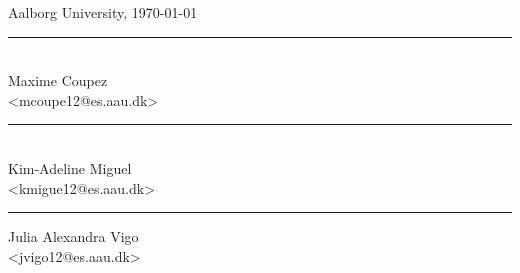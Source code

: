 \vspace{\baselineskip}\hfill Aalborg University, \today
\vfill\noindent
\begin{minipage}[b]{0.45\textwidth}
 \centering
 \rule{\textwidth}{0.5pt}\\
  Maxime Coupez\\
 {\footnotesize <mcoupe12@es.aau.dk>}
\end{minipage}
\hfill
\begin{minipage}[b]{0.45\textwidth}
 \centering
 \rule{\textwidth}{0.5pt}\\
  Kim-Adeline Miguel\\
 {\footnotesize <kmigue12@es.aau.dk>}
\end{minipage}
\vspace{3\baselineskip}
\begin{center}
\begin{minipage}[b]{0.45\textwidth}
 \centering
 \rule{\textwidth}{0.5pt}
  Julia Alexandra Vigo\\
 {\footnotesize <jvigo12@es.aau.dk>}
\end{minipage}
\end{center}
